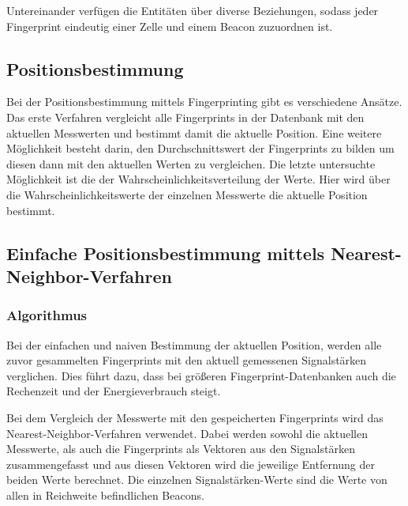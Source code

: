 Untereinander verfügen die Entitäten über diverse Beziehungen, sodass jeder Fingerprint eindeutig einer Zelle und einem Beacon zuzuordnen ist.

\subsection{Positionsbestimmung}
\label{sec:implementation:fingerprinting:positioning}
Bei der Positionsbestimmung mittels Fingerprinting gibt es verschiedene Ansätze.
Das erste Verfahren vergleicht alle Fingerprints in der Datenbank mit den aktuellen Messwerten und bestimmt damit die aktuelle Position.
Eine weitere Möglichkeit besteht darin, den Durchschnittswert der Fingerprints zu bilden um diesen dann mit den aktuellen Werten zu vergleichen.
Die letzte untersuchte Möglichkeit ist die der Wahrscheinlichkeitsverteilung der Werte. Hier wird über die Wahrscheinlichkeitswerte der einzelnen Messwerte die aktuelle Position bestimmt.

\subsection{Einfache Positionsbestimmung mittels Nearest-Neighbor-Verfahren}
\label{sec:implementation:fingerprinting:positioning:naiv}

\subsubsection{Algorithmus}
\label{sec:implementation:fingerprinting:positioning:naiv:algorithm}

Bei der einfachen und naiven Bestimmung der aktuellen Position, werden alle zuvor gesammelten Fingerprints mit den aktuell gemessenen Signalstärken verglichen. Dies führt dazu, dass bei größeren Fingerprint-Datenbanken auch die Rechenzeit und der Energieverbrauch steigt. 

Bei dem Vergleich der Messwerte mit den gespeicherten Fingerprints wird das Nearest-Neighbor-Verfahren verwendet. Dabei werden sowohl die aktuellen Messwerte, als auch die Fingerprints als Vektoren aus den Signalstärken zusammengefasst und aus diesen Vektoren wird die jeweilige Entfernung der beiden Werte berechnet. Die einzelnen Signalstärken-Werte sind die Werte von allen in Reichweite befindlichen Beacons.

